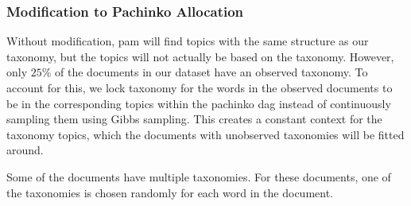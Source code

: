 \subsubsection{Modification to Pachinko Allocation}\label{subsec:mod_pachinko}
Without modification, \gls{pam} will find topics with the same structure as our taxonomy, but the topics will not actually be based on the taxonomy.
However, only $25\%$ of the documents in our dataset have an observed taxonomy.
To account for this, we lock taxonomy for the words in the observed documents to be in the corresponding topics within the pachinko \gls{dag} instead of continuously sampling them using Gibbs sampling.
This creates a constant context for the taxonomy topics, which the documents with unobserved taxonomies will be fitted around.

Some of the documents have multiple taxonomies.
For these documents, one of the taxonomies is chosen randomly for each word in the document.